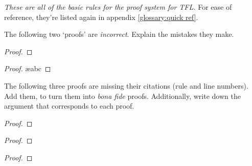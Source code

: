 \emph{These are all of the basic rules for the proof system for TFL.} For ease of reference, they're listed again in appendix \ref{glossary:quick ref}.

\practiceproblems

\problempart
The following two `proofs' are \emph{incorrect}. Explain the mistakes they make.
\begin{proof}
\LEM
\open
\close
\open
\close
{}
\end{proof}

\begin{proof}
\ae{abc}
\end{proof}

\problempart
The following three proofs are missing their citations (rule and line numbers). Add them, to turn them into \emph{bona fide} proofs. Additionally, write down the argument that corresponds to each proof.
\begin{multicols}{2}
\begin{proof}
\end{proof}

\begin{proof}
\open
\close
{}%
\end{proof}

\begin{proof}
\open
\close
\open
\close
{}%
\end{proof}
\end{multicols}

